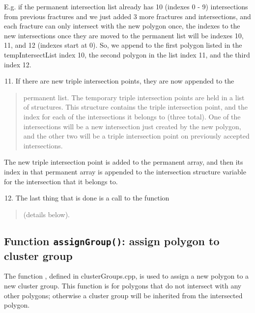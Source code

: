 \documentclass[letterpaper,10pt,english]{sphinxmanual}
\begin{document}
E.g. if the permanent  intersection list already has 10 (indexes 0 -
9) intersections from  previous fractures and we just added 3 more fractures and
intersections, and each fracture can only intersect with the new polygon once,
the indexes to the new intersections once they are moved to the permanent
 list will be indexes 10, 11, and 12 (indexes start at 0). So, we
append to the first polygon listed in the tempIntersectList index 10, the second
polygon in the list index 11, and the third index 12.
\begin{enumerate}
\setcounter{enumi}{10}
\item {} 
If there are new triple intersection points, they are now appended to the

\end{enumerate}
\begin{quote}

permanent  list. The temporary triple intersection points
are held in a list of  structures. This structure
contains the triple intersection point, and the index for each of the
intersections it belongs to (three total). One of the intersections will be
a new intersection just created by the new polygon, and the other two will
be a triple intersection point on previously accepted intersections.
\end{quote}

The new triple intersection point is added to the permanent 
array, and then its index in that permanent array is appended to the
intersection structure variable  for the intersection that it
belongs to.
\begin{enumerate}
\setcounter{enumi}{11}
\item {} 
The last thing that is done is a call to the function 

\end{enumerate}
\begin{quote}

(details below).
\end{quote}


\subsection{Function \texttt{assignGroup()}: assign polygon to cluster group}
\label{dfngen:function-assigngroup-assign-polygon-to-cluster-group}
The function , defined in clusterGroups.cpp,  is used to assign
a new polygon to a new cluster group. This function is for polygons that do not
intersect with any other polygons; otherwise a cluster group will be inherited
from the intersected polygon.
\end{document}
